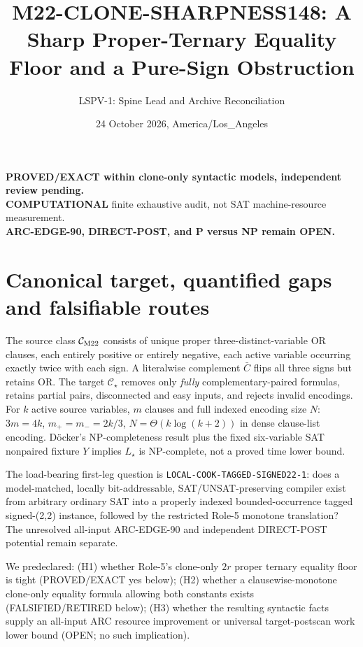 \documentclass[11pt]{article}
\title{M22-CLONE-SHARPNESS148: A Sharp Proper-Ternary Equality Floor and a Pure-Sign Obstruction}
\author{LSPV-1: Spine Lead and Archive Reconciliation}
\date{24 October 2026, America/Los\_Angeles}
\begin{document}
\maketitle
\begin{center}
\textbf{PROVED/EXACT within clone-only syntactic models, independent review pending.}\\
\textbf{COMPUTATIONAL} finite exhaustive audit, not SAT machine-resource measurement.\\
\textbf{ARC-EDGE-90, DIRECT-POST, and P versus NP remain OPEN.}
\end{center}

\section{Canonical target, quantified gaps and falsifiable routes}
The source class $\mathcal C_{\rm M22}$ consists of unique proper three-distinct-variable OR clauses, each entirely positive or entirely negative, each active variable occurring exactly twice with each sign. A literalwise complement $\bar C$ flips all three signs but retains OR. The target $\mathcal C_\star$ removes only \emph{fully} complementary-paired formulas, retains partial pairs, disconnected and easy inputs, and rejects invalid encodings. For $k$ active source variables, $m$ clauses and full indexed encoding size $N$: $3m=4k$, $m_+=m_-=2k/3$, $N=\Theta(k\log(k+2))$ in dense clause-list encoding. D\"ocker's NP-completeness result plus the fixed six-variable SAT nonpaired fixture $Y$ implies $L_\star$ is NP-complete, not a proved time lower bound.

The load-bearing first-leg question is \texttt{LOCAL-COOK-TAGGED-SIGNED22-1}: does a model-matched, locally bit-addressable, SAT/UNSAT-preserving compiler exist from arbitrary ordinary SAT into a properly indexed bounded-occurrence tagged signed-(2,2) instance, followed by the restricted Role-5 monotone translation? The unresolved all-input ARC-EDGE-90 and independent DIRECT-POST potential remain separate.

We predeclared: (H1) whether Role-5's clone-only $2r$ proper ternary equality floor is tight (PROVED/EXACT yes below); (H2) whether a clausewise-monotone clone-only equality formula allowing both constants exists (FALSIFIED/RETIRED below); (H3) whether the resulting syntactic facts supply an all-input ARC resource improvement or universal target-postscan work lower bound (OPEN; no such implication).
\end{document}

